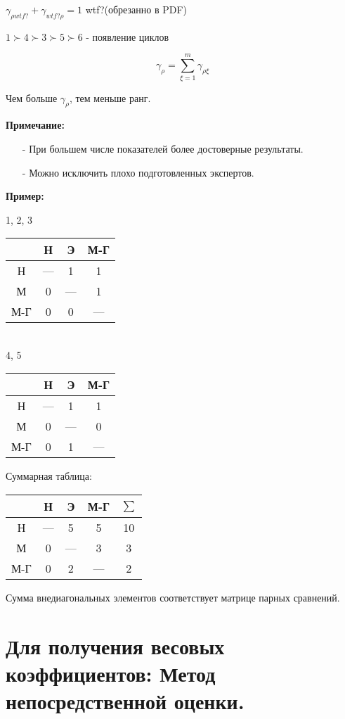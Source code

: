 \documentclass[12pt,a5paper]{scrbook}
\begin{document}
  $\gamma_{\rho wtf?} + \gamma_{wtf?\rho} = 1$ wtf?(обрезанно в PDF)

  $1 \succ 4 \succ 3 \succ 5 \succ 6$ - появление циклов

  $$\gamma_\rho = \sum_{\xi=1}^m\gamma_{\rho\xi}$$

  Чем больше $\gamma_\rho$, тем меньше ранг.

  \textbf{Примечание:}
  \begin{itemize}
    \item[-] При большем числе показателей более достоверные результаты.
    \item[-] Можно исключить плохо подготовленных экспертов.
  \end{itemize}

  \textbf{Пример:}

  1, 2, 3

  \begin{tabular}{c|c|c|c}
    & Н & Э & М-Г\\
    \hline
    Н & --- & 1 & 1\\
    М & 0 & --- & 1\\
    М-Г & 0 & 0 & ---
  \end{tabular}\\

  4, 5

  \begin{tabular}{c|c|c|c}
    & Н & Э & М-Г\\
    \hline
    Н & --- & 1 & 1\\
    М & 0 & --- & 0\\
    М-Г & 0 & 1 & ---
  \end{tabular}

  Суммарная таблица:

  \begin{tabular}{c|c|c|c|c}
    & Н & Э & М-Г & $\sum$\\
    \hline
    Н & --- & 5 & 5 & 10\\
    М & 0 & --- & 3 & 3\\
    М-Г & 0 & 2 & --- & 2
  \end{tabular}

  Сумма внедиагональных элементов соответствует матрице парных сравнений.

  \section{Для получения весовых коэффициентов: Метод непосредственной оценки.}
\end{document}
